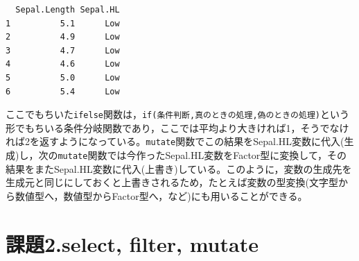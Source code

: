\documentclass[
  a4paper,
]{ltjsbook}
\begin{document}
\begin{verbatim}
  Sepal.Length Sepal.HL
1          5.1      Low
2          4.9      Low
3          4.7      Low
4          4.6      Low
5          5.0      Low
6          5.4      Low
\end{verbatim}

ここでもちいた\texttt{ifelse}関数は，\texttt{if(条件判断,真のときの処理,偽のときの処理)}という形でもちいる条件分岐関数であり，ここでは平均より大きければ1，そうでなければ2を返すようになっている。\texttt{mutate}関数でこの結果をSepal.HL変数に代入(生成)し，次の\texttt{mutate}関数では今作ったSepal.HL変数をFactor型に変換して，その結果をまたSepal.HL変数に代入(上書き)している。このように，変数の生成先を生成元と同じにしておくと上書きされるため，たとえば変数の型変換(文字型から数値型へ，数値型からFactor型へ，など)にも用いることができる。

\section{課題2.select, filter,
mutate}\label{ux8ab2ux984c2.select-filter-mutate}
\end{document}
